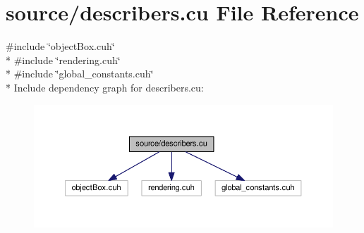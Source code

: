 \hypertarget{cuda_tracer__0__1_2source_2describers_8cu}{}\section{source/describers.cu File Reference}
\label{cuda_tracer__0__1_2source_2describers_8cu}
{\ttfamily \#include \char`\"{}object\+Box.\+cuh\char`\"{}}\\*
{\ttfamily \#include \char`\"{}rendering.\+cuh\char`\"{}}\\*
{\ttfamily \#include \char`\"{}global\+\_\+constants.\+cuh\char`\"{}}\\*
Include dependency graph for describers.\+cu\+:
\nopagebreak
\begin{figure}[H]
\begin{center}
\leavevmode
\includegraphics[width=350pt]{cuda_tracer__0__1_2source_2describers_8cu__incl}
\end{center}
\end{figure}
